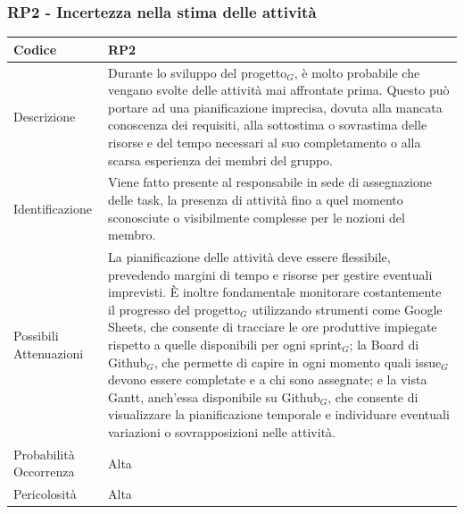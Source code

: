 \documentclass[10pt]{article}
\begin{document}
{    \subsubsection{RP2 - Incertezza nella stima delle attività}
    \label{RP2}
    \begin{tabularx}{\textwidth}{|l|X|}
    \hline
    \rowcolor{gray!25}
    Codice & RP2 \\
    \hline
    Descrizione &  Durante lo sviluppo del progetto$_G$, è molto probabile che vengano svolte delle attività mai affrontate prima. Questo può portare ad una pianificazione imprecisa, dovuta alla mancata conoscenza dei requisiti, alla sottostima o sovrastima delle risorse e del tempo necessari al suo completamento o alla scarsa esperienza dei membri del gruppo. \\
    \hline
    Identificazione &  Viene fatto presente al responsabile in sede di assegnazione delle task, la presenza di attività fino a quel momento sconosciute o visibilmente complesse per le nozioni del membro.\\ 
    \hline
    Possibili Attenuazioni &  La pianificazione delle attività deve essere flessibile, prevedendo margini di tempo e risorse per gestire eventuali imprevisti. È inoltre fondamentale monitorare costantemente il progresso del progetto$_G$ utilizzando strumenti come Google Sheets, che consente di tracciare le ore produttive impiegate rispetto a quelle disponibili per ogni sprint$_G$; la Board di Github$_G$, che permette di capire in ogni momento quali issue$_G$ devono essere completate e a chi sono assegnate; e la vista Gantt, anch'essa disponibile su Github$_G$, che consente di visualizzare la pianificazione temporale e individuare eventuali variazioni o sovrapposizioni nelle attività. \\
    \hline
    Probabilità Occorrenza &  Alta \\
    \hline
    Pericolosità & Alta \\ 
    \hline
    \end{tabularx}


}
\end{document}
